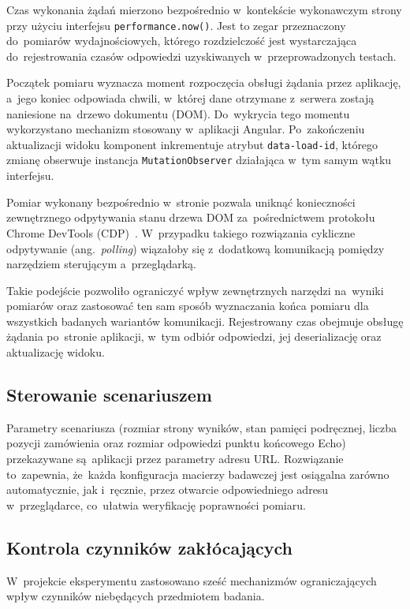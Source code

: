 Czas wykonania żądań mierzono bezpośrednio w~kontekście wykonawczym
strony przy użyciu interfejsu \texttt{performance.now()}. Jest to zegar
przeznaczony do~pomiarów wydajnościowych, którego rozdzielczość jest
wystarczająca do~rejestrowania czasów odpowiedzi uzyskiwanych
w~przeprowadzonych testach.

Początek pomiaru wyznacza moment rozpoczęcia obsługi żądania przez
aplikację, a~jego koniec odpowiada chwili, w~której dane
otrzymane z~serwera zostają naniesione na~drzewo dokumentu (DOM).
Do~wykrycia tego momentu wykorzystano mechanizm stosowany w~aplikacji
Angular. Po~zakończeniu aktualizacji widoku komponent inkrementuje
atrybut \texttt{data-load-id}, którego zmianę obserwuje instancja
\texttt{MutationObserver} działająca w~tym samym wątku interfejsu.

Pomiar wykonany bezpośrednio w~stronie pozwala uniknąć konieczności
zewnętrznego odpytywania stanu drzewa DOM za~pośrednictwem protokołu
Chrome DevTools (CDP)~\cite{bib:CDP}. W~przypadku takiego rozwiązania
cykliczne odpytywanie (ang.\ \textit{polling}) wiązałoby się
z~dodatkową komunikacją pomiędzy narzędziem sterującym a~przeglądarką.

Takie podejście pozwoliło ograniczyć wpływ zewnętrznych narzędzi
na~wyniki pomiarów oraz zastosować ten sam sposób wyznaczania końca
pomiaru dla wszystkich badanych wariantów komunikacji. Rejestrowany
czas obejmuje obsługę żądania po~stronie aplikacji, w~tym odbiór
odpowiedzi, jej deserializację oraz aktualizację widoku.

\subsection{Sterowanie scenariuszem}
\label{subsec:SterowanieScenariuszem}

Parametry scenariusza (rozmiar strony wyników, stan pamięci podręcznej, liczba pozycji zamówienia oraz rozmiar odpowiedzi punktu końcowego Echo) przekazywane są~aplikacji przez parametry adresu URL. Rozwiązanie to~zapewnia, że~każda konfiguracja macierzy badawczej jest osiągalna zarówno automatycznie, jak i~ręcznie, przez otwarcie odpowiedniego adresu w~przeglądarce, co~ułatwia weryfikację poprawności pomiaru.

\subsection{Kontrola czynników zakłócających}
\label{subsec:KontrolaCzynnikow}

W~projekcie eksperymentu zastosowano sześć mechanizmów ograniczających wpływ czynników niebędących przedmiotem badania.


